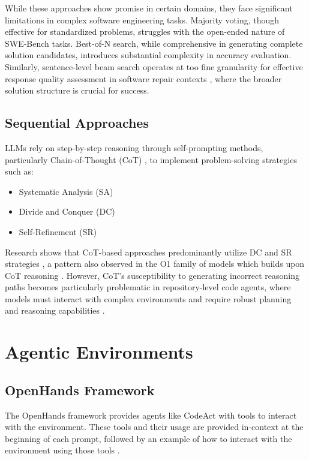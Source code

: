 While these approaches show promise in certain domains, they face significant limitations in complex software engineering tasks. Majority voting, though effective for standardized problems, struggles with the open-ended nature of SWE-Bench tasks. Best-of-N search, while comprehensive in generating complete solution candidates, introduces substantial complexity in accuracy evaluation. Similarly, sentence-level beam search operates at too fine granularity for effective response quality assessment in software repair contexts \cite{xu2024llavaO1letvisionlanguage}, where the broader solution structure is crucial for success.

\subsection{Sequential Approaches}
LLMs rely on step-by-step reasoning through self-prompting methods, particularly Chain-of-Thought (CoT) \cite{wei2023chainofthoughtpromptingelicitsreasoning}, to implement problem-solving strategies such as:
\begin{itemize}
    \item Systematic Analysis (SA)
    \item Divide and Conquer (DC)
    \item Self-Refinement (SR)
\end{itemize}

Research shows that CoT-based approaches predominantly utilize DC and SR strategies \cite{xu2024llavaO1letvisionlanguage, chu2024navigateenigmaticlabyrinthsurvey}, a pattern also observed in the O1 family of models which builds upon CoT reasoning \cite{openai_reasoning_docs, wu2024comparativestudyreasoningpatterns}. However, CoT's susceptibility to generating incorrect reasoning paths \cite{wei2023chainofthoughtpromptingelicitsreasoning} becomes particularly problematic in repository-level code agents, where models must interact with complex environments and require robust planning and reasoning capabilities \cite{zheng2024makeslargelanguagemodels}.

\section{Agentic Environments}
\label{sec:agentic}

\subsection{OpenHands Framework}
The OpenHands framework provides agents like CodeAct \cite{wang2024executablecodeactionselicit} with tools to interact with the environment. These tools and their usage are provided in-context at the beginning of each prompt, followed by an example of how to interact with the environment using those tools \cite{wang2024openhandsopenplatformai}. 

